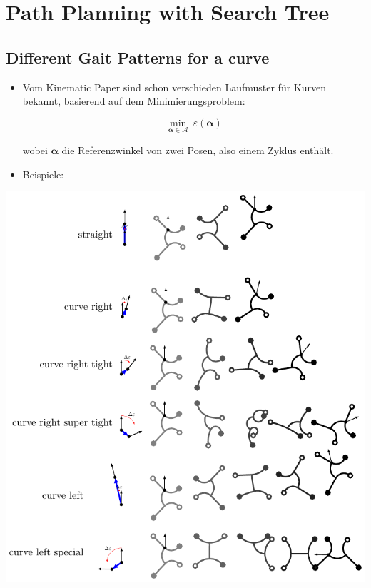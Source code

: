 \documentclass[10pt,a4paper]{article}
\begin{document}
\section{Path Planning with Search Tree}


\subsection{Different Gait Patterns for a curve}

\begin{itemize}
	\item Vom Kinematic Paper sind schon verschieden Laufmuster für Kurven bekannt, basierend auf dem Minimierungsproblem:
	
	\begin{equation}
		\displaystyle\min_{\bm{\alpha} \in \mathcal{A}} ~ \varepsilon(\bm{\alpha})
	\end{equation}
	
	wobei $\bm{\alpha}$ die Referenzwinkel von zwei Posen, also einem Zyklus enthält.

	\item Beispiele:

\end{itemize}

\includegraphics[width=.95\textwidth]{pics/trajectory_planner/elements.pdf}
\end{document}
